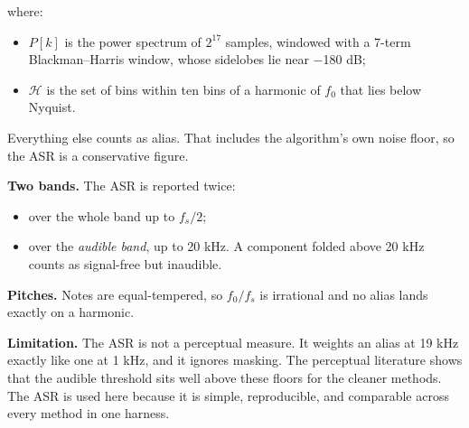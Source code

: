 \documentclass[conference]{IEEEtran}
\begin{document}
where:

\begin{itemize}
\item $P[k]$ is the power spectrum of $2^{17}$ samples, windowed with a 7-term Blackman–Harris window, whose sidelobes lie near −180 dB;
\item $\mathcal H$ is the set of bins within ten bins of a harmonic of $f_0$ that lies below Nyquist.
\end{itemize}

Everything else counts as alias. That includes the algorithm's own noise floor, so the ASR is a conservative figure.

\textbf{Two bands.} The ASR is reported twice:

\begin{itemize}
\item over the whole band up to $f_s/2$;
\item over the \emph{audible band}, up to 20 kHz. A component folded above 20 kHz counts as signal-free but inaudible.
\end{itemize}

\textbf{Pitches.} Notes are equal-tempered, so $f_0/f_s$ is irrational and no alias lands exactly on a harmonic.

\textbf{Limitation.} The ASR is not a perceptual measure. It weights an alias at 19 kHz exactly like one at 1 kHz, and it ignores masking. The perceptual literature \cite{r22,r23,r28,r40} shows that the audible threshold sits well above these floors for the cleaner methods. The ASR is used here because it is simple, reproducible, and comparable across every method in one harness.

\setcounter{subsection}{1}
\end{document}
